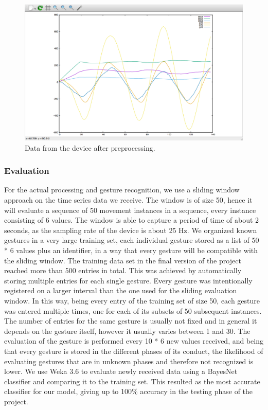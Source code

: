 \begin{figure}[h]
\centering
\includegraphics[width=1\columnwidth]{img/20}
\caption{Data from the device after preprocessing.}
\label{fig:figure3}
\end{figure}

\subsubsection{Evaluation}
For the actual processing and gesture recognition, we use a sliding window approach on the time series data we receive.
The window is of size 50, hence it will evaluate a sequence of 50 movement instances in a sequence,
every instance consisting of 6 values.
The window is able to capture a period of time of about 2 seconds, as the sampling rate of the device is about 25 Hz.
We organized known gestures in a very large training set, each individual gesture stored as a list of 50 * 6 values plus an identifier, in a way that every gesture will be compatible with the sliding window. 
The training data set in the final version of the project reached more than 500 entries in total.
This was achieved by automatically storing multiple entries for each single gesture.
Every gesture was intentionally registered on a larger interval than the one used for the sliding evaluation window.
In this way, being every entry of the training set of size 50,  each gesture was entered multiple times, one for each of its subsets of 50 subsequent instances.
The number of entries for the same gesture is usually not fixed and in general it depends on the gesture itself, however it usually varies between 1 and 30.
The evaluation of the gesture is performed every 10 * 6 new values received, and being that every gesture is stored in the different phases of its conduct, the likelihood of evaluating gestures that are in unknown phases and therefore not recognized is lower.
We use Weka 3.6 to evaluate newly received data using a BayesNet classifier and comparing it to the training set. 
This resulted as the most accurate classifier for our model, giving up to 100\% accuracy in the testing phase of the project.




